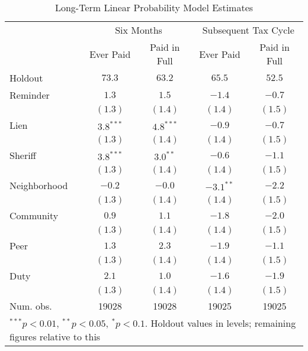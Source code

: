 \begin{table}[htb]
\caption{Long-Term Linear Probability Model Estimates}
\label{ltmpme}
\begin{center}
\begin{tabular}{l c c c c }
\hline
 & \multicolumn{2}{c}{Six Months} & \multicolumn{2}{c}{Subsequent Tax Cycle} \\
 & Ever Paid & Paid in Full & Ever Paid & Paid in Full \\
Holdout      & $73.3$ & $63.2$ & $65.5$ & $52.5$ \\
\hline
Reminder     & $1.3$        & $1.5$        & $-1.4$       & $-0.7$       \\
             & $(1.3)$      & $(1.4)$      & $(1.4)$      & $(1.5)$      \\
Lien         & $3.8^{***}$  & $4.8^{***}$  & $-0.9$       & $-0.7$       \\
             & $(1.3)$      & $(1.4)$      & $(1.4)$      & $(1.5)$      \\
Sheriff      & $3.8^{***}$  & $3.0^{**}$   & $-0.6$       & $-1.1$       \\
             & $(1.3)$      & $(1.4)$      & $(1.4)$      & $(1.5)$      \\
Neighborhood & $-0.2$       & $-0.0$       & $-3.1^{**}$  & $-2.2$       \\
             & $(1.3)$      & $(1.4)$      & $(1.4)$      & $(1.5)$      \\
Community    & $0.9$        & $1.1$        & $-1.8$       & $-2.0$       \\
             & $(1.3)$      & $(1.4)$      & $(1.4)$      & $(1.5)$      \\
Peer         & $1.3$        & $2.3$        & $-1.9$       & $-1.1$       \\
             & $(1.3)$      & $(1.4)$      & $(1.4)$      & $(1.5)$      \\
Duty         & $2.1$        & $1.0$        & $-1.6$       & $-1.9$       \\
             & $(1.3)$      & $(1.4)$      & $(1.4)$      & $(1.5)$      \\
\hline
Num. obs.    & 19028        & 19028        & 19025        & 19025        \\
\hline
\multicolumn{5}{l}{\scriptsize{$^{***}p<0.01$, $^{**}p<0.05$, $^*p<0.1$. Holdout values in levels; remaining figures relative to this}}
\end{tabular}
\label{lg_pc_lin}
\end{center}
\end{table}

